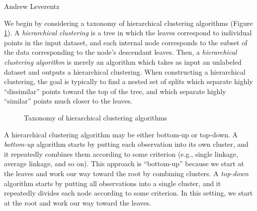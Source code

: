 \documentclass[11pt]{article}
\begin{document}
\begin{flushright}
Andrew Leverentz
\end{flushright}

We begin by considering a taxonomy of hierarchical clustering algorithms (Figure \ref{fig:taxonomy}).
A \emph{hierarchical clustering} is a tree in which the leaves correspond to individual points in the input dataset, and each internal node corresponds to the subset of the data corresponding to the node's descendant leaves.
Then, a \emph{hierarchical clustering algorithm} is merely an algorithm which takes as input an unlabeled dataset and outputs a hierarchical clustering.
When constructing a hierarchical clustering, the goal is typically to find a nested set of splits which separate highly ``dissimilar'' points toward the top of the tree, and which separate highly ``similar'' points much closer to the leaves.

\begin{figure}[h]
\centering
{}
\caption{Taxonomy of hierarchical clustering algorithms}
\label{fig:taxonomy}
\end{figure}

A hierarchical clustering algorithm may be either bottom-up or top-down.
A \emph{bottom-up} algorithm starts by putting each observation into its own cluster, and it repeatedly combines them according to some criterion (e.g., single linkage, average linkage, and so on).
This approach is ``bottom-up'' because we start at the leaves and work our way toward the root by combining clusters.
A \emph{top-down} algorithm starts by putting all observations into a single cluster, and it repeatedly divides each node according to some criterion.
In this setting, we start at the root and work our way toward the leaves.
\end{document}
